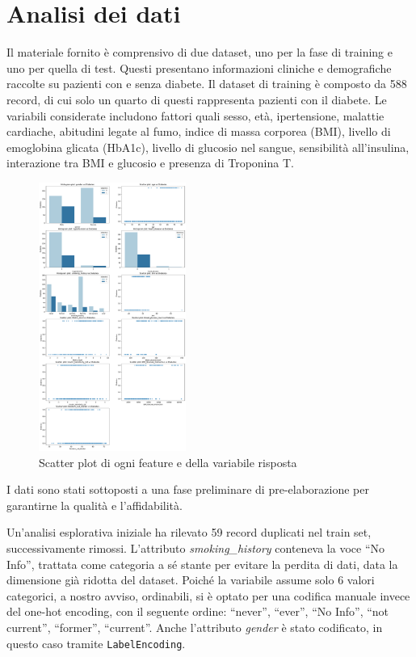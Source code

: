 \documentclass[conference]{IEEEtran}
\begin{document}
\section{Analisi dei dati}
Il materiale fornito è comprensivo di due dataset, uno per la fase di training e uno per quella di test. Questi presentano informazioni cliniche e demografiche raccolte su pazienti con e senza diabete. Il dataset di training è composto da 588 record, di cui solo un quarto di questi rappresenta pazienti con il diabete. Le variabili considerate includono fattori quali sesso, età, ipertensione, malattie cardiache, abitudini legate al fumo, indice di massa corporea (BMI), livello di emoglobina glicata (HbA1c), livello di glucosio nel sangue, sensibilità all’insulina, interazione tra BMI e glucosio e presenza di Troponina T. 

\begin{figure}[htbp]
    \centering
    \includegraphics[width=0.43\textwidth]{features_vs_diabetes.pdf}
    \caption{Scatter plot di ogni feature e della variabile risposta}
    \label{features}
\end{figure}

I dati sono stati sottoposti a una fase preliminare di pre-elaborazione per garantirne la qualità e l’affidabilità.

Un'analisi esplorativa iniziale ha rilevato 59 record duplicati nel train set, successivamente rimossi. L’attributo \emph{smoking\_history} conteneva la voce “No Info”, trattata come categoria a sé stante per evitare la perdita di dati, data la dimensione già ridotta del dataset. Poiché la variabile assume solo 6 valori categorici, a nostro avviso, ordinabili, si è optato per una codifica manuale invece del one-hot encoding, con il seguente ordine: “never”, “ever”, “No Info”, “not current”, “former”, “current”. Anche l’attributo \emph{gender} è stato codificato, in questo caso tramite \texttt{LabelEncoding}.
\end{document}
